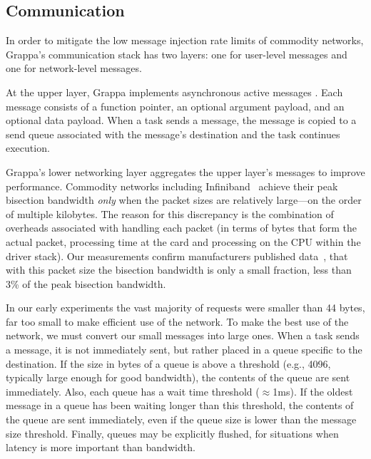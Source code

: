\subsection{Communication}
\label{sec:communication}

In order to mitigate the low message injection rate limits of commodity networks, Grappa's communication stack has two layers: one for user-level messages and one for network-level messages.

At the upper layer, Grappa implements asynchronous active messages \cite{vonEicken92}. Each message consists of a function pointer, an optional argument payload, and an optional data payload. When a task sends a message, the message is copied to a send queue associated with the message's destination and the task continues execution.

Grappa's lower networking layer aggregates the upper layer's messages to
improve performance. Commodity networks including
Infiniband~\cite{infinibandbandwidth} achieve their peak bisection bandwidth
\emph{only} when the packet sizes are relatively large---on the order of
multiple kilobytes. The reason for this discrepancy is the combination of
overheads associated with handling each packet (in terms of bytes that form
the actual packet, processing time at the card and processing on the CPU
within the driver stack). Our measurements confirm manufacturers published
data~\cite{infinibandbandwidth}, that with this packet size the bisection
bandwidth is only a small fraction, less than 3\% of the peak bisection
bandwidth.

In our early experiments the vast majority of requests were smaller than 44
bytes, far too small to make efficient use of the network. To make the best
use of the network, we must convert our small messages into large ones. When a
task sends a message, it is not immediately sent, but rather placed in a queue
specific to the destination. If the size in bytes of a queue is above a
threshold (e.g., 4096, typically large enough for good bandwidth), the
contents of the queue are sent immediately. Also, each queue has a wait time
threshold ($\approx${1ms}). If the oldest message in a queue has been waiting
longer than this threshold, the contents of the queue are sent immediately,
even if the queue size is lower than the message size threshold. Finally,
queues may be explicitly flushed, for situations when latency is more
important than bandwidth.


